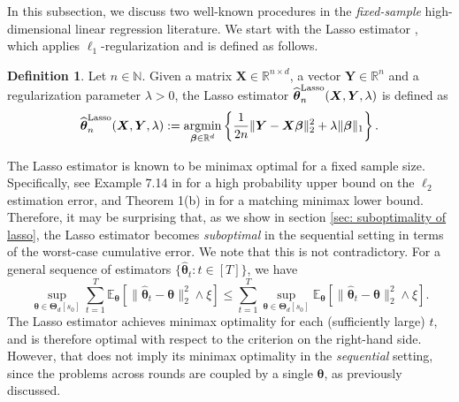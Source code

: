 \documentclass[aos,preprint]{imsart}
\theoremstyle{plain}
\theoremstyle{definition}
\newtheorem{definition}{Definition}
\newcommand{\bTheta}{\boldsymbol{\Theta}}
\newcommand{\btheta}{\boldsymbol{\theta}}
\newcommand{\bd}[1]{\boldsymbol{#1}}
\newcommand{\hbtheta}{\widehat{\boldsymbol{\theta}}}
\newcommand{\bX}{\boldsymbol{X}}
\DeclareMathOperator*{\argmin}{argmin}
\newcommand{\mR}{\mathbb{R}}
\newcommand{\ltheta}{\hbtheta^{\textup{Lasso}}}
\newcommand{\bY}{\boldsymbol{Y}}
\newcommand{\bN}{\mathbb{N}}
\newcommand{\Exp}{\mathbb{E}}
\begin{document}
In this subsection, we discuss two well-known procedures in the \textit{fixed-sample} high-dimensional linear regression literature. We start with the Lasso estimator \citep{tibshirani1996regression}, which applies $\ell_1$-regularization and is defined as follows.

\begin{definition}\label{def: lasso}
Let $n \in \bN$. 
Given a matrix $\bX\in\mR^{n\times d}$, a vector $\bY\in \mR^n$ and a regularization parameter $\lambda > 0$, the Lasso estimator $\ltheta_n(\bX, \bY, \lambda)$ %
is defined as 
$$\ltheta_n(\bX, \bY, \lambda) :=\argmin_{\bd{\beta}\in \mR^d} \left\{\frac{1}{2n}\|\bY-\bX\bd{\beta} \|_2^2+\lambda\|\bd{\beta}\|_1 \right\}.$$ 
\end{definition}




The Lasso estimator is known to be minimax optimal for a fixed sample size. Specifically, see Example 7.14 in \cite{wainwright2019high} for a high probability upper bound on the $\ell_2$ estimation error, and Theorem 1(b) in \cite{raskutti2011minimax} for a matching minimax lower bound. Therefore, it may be surprising that, as we show in section \ref{sec: suboptimality of lasso}, the Lasso estimator becomes \textit{suboptimal} in the sequential setting in terms of the worst-case cumulative error.   We note that this is not contradictory. For a general sequence of estimators $\{\hbtheta_t: t \in [T]\}$, we have
$$
\sup_{\btheta\in \bTheta_d[s_0]}\sum_{t=1}^T \Exp_{\btheta} \left[\|\hbtheta_t-\btheta\|_2^2 \wedge \xi \right]\le \sum_{t=1}^T \sup_{\btheta\in \bTheta_d[s_0]} \Exp_{\btheta} \left[\|\hbtheta_t-\btheta\|_2^2 \wedge \xi \right].
$$
The Lasso estimator achieves minimax optimality for each (sufficiently large) $t$, and is therefore optimal with respect to the criterion on the right-hand side. However, that does not imply its minimax optimality in the \textit{sequential} setting,  since the problems across rounds are coupled by a single $\btheta$, as previously discussed.


\end{document}
